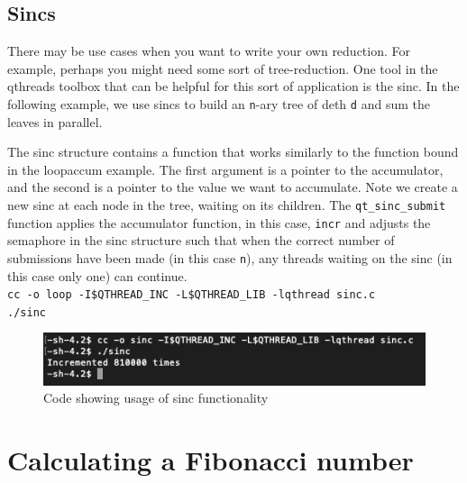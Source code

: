 \documentclass[12pt,fullpage]{article}
\begin{document}
\subsection{Sincs}
There may be use cases when you want to write your own reduction. For example,
perhaps you might need some sort of tree-reduction. One tool in the qthreads
toolbox that can be helpful for this sort of application is the sinc. In the
following example, we use sincs to build an {\tt n}-ary tree of deth {\tt d}
and sum the leaves in parallel.

The sinc structure contains a function that works similarly to the function
bound in the loopaccum example. The first argument is a pointer to the
accumulator, and the second is a pointer to the value we want to accumulate.
Note we create a new sinc at each node in the tree, waiting on its children. The
{\tt qt\_sinc\_submit} function applies the accumulator function, in this case,
{\tt incr} and adjusts the semaphore in the sinc structure such that when the
correct number of submissions have been made (in this case {\tt n}), any threads
waiting on the sinc (in this case only one) can continue.
\\
{\footnotesize{\tt cc -o loop -I\$QTHREAD\_INC -L\$QTHREAD\_LIB -lqthread sinc.c}}
\\
{\footnotesize{\tt ./sinc}}
\begin{figure}[h]
\includegraphics[scale=1.0]{sinc.png}
\caption{Code showing usage of sinc functionality}
\end{figure}
\newpage


\newpage
\section{Calculating a Fibonacci number}
\end{document}
